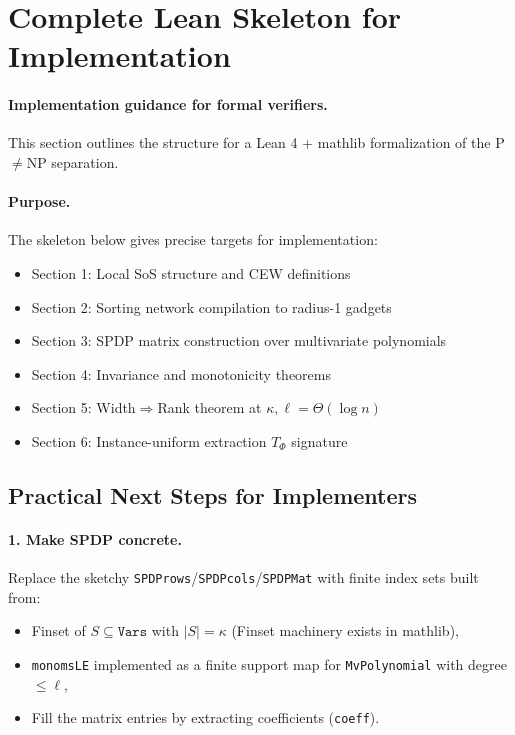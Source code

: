 \documentclass[12pt]{article}
\theoremstyle{definition}
\theoremstyle{definition}
\theoremstyle{remark}
\theoremstyle{remark}
\begin{document}
\section{Complete Lean Skeleton for Implementation}
\label{sec:lean-sketch}

\paragraph{Implementation guidance for formal verifiers.}
This section outlines the structure for a Lean 4 + mathlib formalization of the P$\neq$NP separation.

\paragraph{Purpose.}
The skeleton below gives precise targets for implementation:
\begin{itemize}
\item Section 1: Local SoS structure and CEW definitions
\item Section 2: Sorting network compilation to radius-1 gadgets
\item Section 3: SPDP matrix construction over multivariate polynomials
\item Section 4: Invariance and monotonicity theorems
\item Section 5: Width$\Rightarrow$Rank theorem at $\kappa,\ell = \Theta(\log n)$
\item Section 6: Instance-uniform extraction $T_\Phi$ signature
\end{itemize}


\subsection{Practical Next Steps for Implementers}

\paragraph{1. Make SPDP concrete.}
Replace the sketchy \texttt{SPDProws}/\texttt{SPDPcols}/\texttt{SPDPMat} with finite index sets built from:
\begin{itemize}
\item Finset of $S \subseteq \texttt{Vars}$ with $|S| = \kappa$ (Finset machinery exists in mathlib),
\item \texttt{monomsLE} implemented as a finite support map for \texttt{MvPolynomial} with degree $\leq \ell$,
\item Fill the matrix entries by extracting coefficients (\texttt{coeff}).
\end{itemize}
\end{document}
